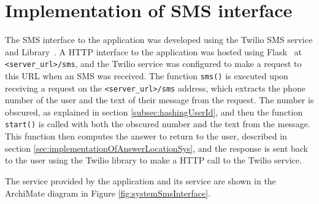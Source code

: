 \documentclass[authoryearcitations]{UoYCSproject}
\begin{document}
\section{Implementation of SMS interface}
\label{sec:implSms}
The SMS interface to the application was developed using the Twilio SMS service and Library~\cite{serviceTwilio, libraryTwilio2}. A HTTP interface to the application was hosted using Flask~\cite{libraryFlask} at \texttt{<server\_url>/sms}, and the Twilio service was configured to make a request to this URL when an SMS was received. The function \texttt{sms()} is executed upon receiving a request on the \texttt{<server\_url>/sms} address, which extracts the phone number of the user and the text of their message from the request. The number is obscured, as explained in section \ref{subsec:hashingUserId}, and then the function \texttt{start()} is called with both the obscured number and the text from the message. This function then computes the answer to return to the user, described in section \ref{sec:implementationOfAnswerLocationSys}, and the response is sent back to the user using the Twilio library to make a HTTP call to the Twilio service.

The service provided by the application and its service are shown in the ArchiMate diagram in Figure \ref{fig:systemSmsInterface}.
\end{document}
